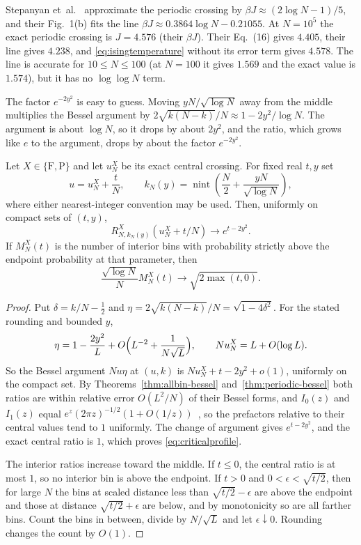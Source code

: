 Stepanyan et~al.\@~\cite[Eq.~(16)]{stepanyan2024} approximate the periodic
crossing by $\beta J\approx(2\log N-1)/5$, and their Fig.~1(b) fits the line
$\beta J\approx0.3864\log N-0.21055$. At $N=10^5$ the exact periodic crossing
is $J=4.576$ (their $\beta J$). Their Eq.~(16) gives $4.405$, their line gives
$4.238$, and \eqref{eq:isingtemperature} without its error term gives $4.578$.
The line is accurate for $10\le N\le100$ (at $N=100$ it gives $1.569$ and the
exact value is $1.574$), but it has no $\log\log N$ term.

The factor $e^{-2y^2}$ is easy to guess. Moving $yN/\sqrt{\log N}$ away from
the middle multiplies the Bessel argument by
$2\sqrt{k(N-k)}/N\approx1-2y^2/\log N$. The argument is about $\log N$, so it
drops by about $2y^2$, and the ratio, which grows like $e$ to the argument,
drops by about the factor $e^{-2y^2}$.

\begin{theorem}\label{thm:critical-window}
Let $X\in\{\mathrm F,\mathrm P\}$ and let $u_N^X$ be its exact central crossing.
For fixed real $t,y$ set
\[
u=u_N^X+\frac tN,\qquad
k_N(y)=\operatorname{nint}\!\left(\frac N2+\frac{yN}{\sqrt{\log N}}\right),
\]
where either nearest-integer convention may be used. Then, uniformly on compact
sets of $(t,y)$,
\begin{equation}\label{eq:criticalprofile}
R^X_{N,k_N(y)}(u_N^X+t/N)\longrightarrow e^{t-2y^2}.
\end{equation}
If $M_N^X(t)$ is the number of interior bins with probability strictly above the
endpoint probability at that parameter, then
\begin{equation}\label{eq:criticalcount}
\frac{\sqrt{\log N}}N M_N^X(t)\longrightarrow\sqrt{2\max(t,0)}.
\end{equation}
\end{theorem}
\begin{proof}
Put $\delta=k/N-\frac12$ and $\eta=2\sqrt{k(N-k)}/N=\sqrt{1-4\delta^2}$. For the
stated rounding and bounded $y$,
\[
\eta=1-\frac{2y^2}{L}+O\Bigl(L^{-2}+\frac1{N\sqrt L}\Bigr),
\qquad Nu_N^X=L+O(\log L).
\]
So the Bessel argument $Nu\eta$ at $(u,k)$ is $Nu_N^X+t-2y^2+o(1)$, uniformly
on the compact set. By Theorems~\ref{thm:allbin-bessel}
and~\ref{thm:periodic-bessel} both ratios are within relative error
$O(L^2/N)$ of their Bessel forms, and $I_0(z)$ and $I_1(z)$ equal
$e^z(2\pi z)^{-1/2}(1+O(1/z))$~\cite[Eq.~10.40.1]{dlmf}, so the prefactors
relative to their central values tend to $1$ uniformly. The change of argument
gives $e^{t-2y^2}$, and the exact central ratio is $1$, which proves
\eqref{eq:criticalprofile}.

The interior ratios increase toward the middle. If $t\le0$, the central ratio
is at most $1$, so no interior bin is above the endpoint. If $t>0$ and
$0<\epsilon<\sqrt{t/2}$, then for large $N$ the bins at scaled distance less
than $\sqrt{t/2}-\epsilon$ are above the endpoint and those at distance
$\sqrt{t/2}+\epsilon$ are below, and by monotonicity so are all farther bins.
Count the bins in between, divide by $N/\sqrt L$ and let $\epsilon\downarrow0$.
Rounding changes the count by $O(1)$.
\end{proof}

